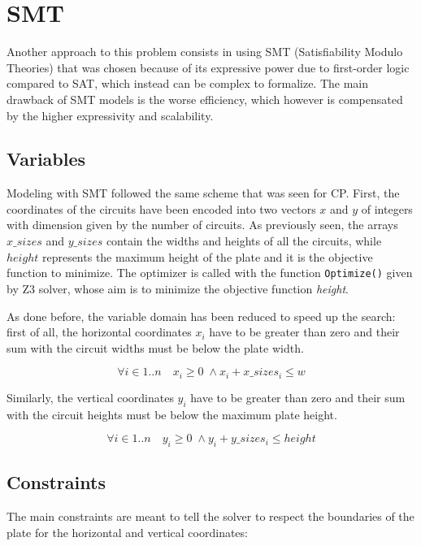 \section{SMT}

Another approach to this problem consists in using SMT (Satisfiability Modulo Theories) that was chosen because of its expressive power due to first-order logic compared to SAT, which instead can be complex to formalize. The main drawback of SMT models is the worse efficiency, which however is compensated by the higher expressivity and scalability.

\subsection{Variables}

Modeling with SMT followed the same scheme that was seen for CP.
First, the coordinates of the circuits have been encoded into two vectors $x$ and $y$ of integers with dimension given by the number of circuits.
As previously seen, the arrays $x\_sizes$ and $y\_sizes$ contain the widths and heights of all the circuits, while $height$ represents the maximum height of the plate and it is the objective function to minimize.
The optimizer is called with the function \verb|Optimize()| given by Z3 solver, whose aim is to minimize the objective function \textit{height}.

As done before, the variable domain has been reduced to speed up the search: first of all, the horizontal coordinates $x_i$ have to be greater than zero and their sum with the circuit widths must be below the plate width.

\begin{equation*}
    \forall i \in {1..n} \quad x_i \geq 0 \; \land x_i + x\_sizes_i \leq w
\end{equation*}

Similarly, the vertical coordinates $y_i$ have to be greater than zero and their sum with the circuit heights must be below the maximum plate height.

\begin{equation*}
     \forall i \in {1..n} \quad y_i \geq 0 \; \land y_i + y\_sizes_i \leq height
\end{equation*}

\subsection{Constraints}

The main constraints are meant to tell the solver to respect the boundaries of the plate for the horizontal and vertical coordinates:


